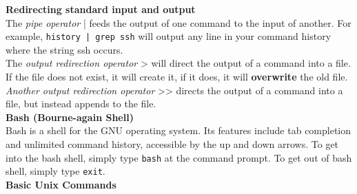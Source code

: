 \documentclass[a4paper]{article}
\begin{document}
\begin{landscape}
\begin{multicols}{3}
\vspace{2mm}
\textbf{Redirecting standard input and output}\\
The \textit{pipe operator} | feeds the output of one command to
the input of another. For example, \verb+history | grep ssh+ will
 output any line in your command history where
the string ssh occurs.\\
The \textit{output redirection operator} > will direct the output of
a command into a file. If the file does not exist, it will
create it, if it does, it will \textbf{overwrite} the old file.\\
\textit{Another output redirection operator} >> directs the output
of a command into a file, but instead appends to the file.\\

\columnbreak 
\textbf{Bash (Bourne-again Shell)}\\
Bash is a shell for the GNU operating system. Its features
include tab completion and unlimited command history,
accessible by the up and down arrows. To get into the
bash shell, simply type \verb+bash+ at the command prompt. To
get out of bash shell, simply type \verb+exit+.\\

\vspace{2mm}
\textbf{Basic Unix Commands}\\


\end{multicols}
\end{landscape}
\end{document}
